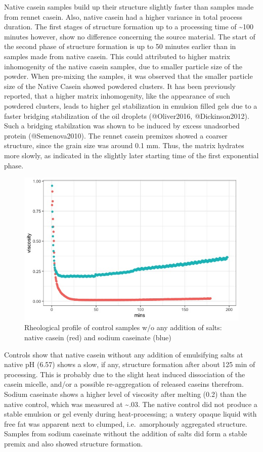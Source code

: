 \documentclass[
]{article}
\begin{document}
Native casein samples build up their structure slightly faster than
samples made from rennet casein. Also, native casein had a higher
variance in total process duration. The first stages of structure
formation up to a processing time of \textasciitilde100 minutes however,
show no difference concerning the source material. The start of the
second phase of structure formation is up to 50 minutes earlier than in
samples made from native casein. This could attributed to higher matrix
inhomogenity of the native casein samples, due to smaller particle size
of the powder. When pre-mixing the samples, it was observed that the
smaller particle size of the Native Casein showed powdered clusters. It
has been previously reported, that a higher matrix inhomogenity, like
the appearance of such powdered clusters, leads to higher gel
stabilization in emulsion filled gels due to a faster bridging
stabilization of the oil droplets (@Oliver2016, @Dickinson2012). Such a
bridging stabilzation was shown to be induced by excess unadsorbed
protein (@Semenova2010). The rennet casein premixes showed a coarser
structure, since the grain size was around 0.1 mm. Thus, the matrix
hydrates more slowly, as indicated in the slightly later starting time
of the first exponential phase.

\begin{figure}
\includegraphics[width=0.6\linewidth]{plots/1.8_control} \caption[Apparent viscosity of sodium caseinate and native casein controls]{Rheological profile of control samples w/o any addition of salts: native casein (red) and sodium caseinate (blue)}\label{fig:unnamed-chunk-11}
\end{figure}

Controls show that native casein without any addition of emulsifying
salts at native pH (6.57) shows a slow, if any, structure formation
after about 125 min of processing. This is probably due to the slight
heat induced dissociation of the casein micelle, and/or a possible
re-aggregation of released caseins therefrom. Sodium caseinate shows a
higher level of viscosity after melting (0.2) than the native control,
which was measured at \textasciitilde.03. The native control did not
produce a stable emulsion or gel evenly during heat-processing; a watery
opaque liquid with free fat was apparent next to clumped,
i.e.~amorphously aggregated structure. Samples from sodium caseinate
without the addition of salts did form a stable premix and also showed
structure formation.
\end{document}
